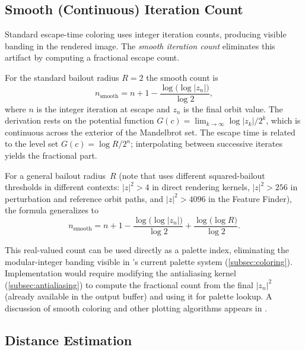 \subsection{Smooth (Continuous) Iteration Count}
\label{subsec:smooth-coloring}

Standard escape-time coloring uses integer iteration counts, producing
visible banding in the rendered image.  The \emph{smooth iteration
count} eliminates this artifact by computing a fractional escape count.

For the standard bailout radius $R = 2$ the smooth count is
\begin{equation}
  n_{\text{smooth}} = n + 1
    - \frac{\log\!\bigl(\log|z_n|\bigr)}{\log 2},
  \label{eq:smooth-iter}
\end{equation}
where $n$ is the integer iteration at escape and $z_n$ is the final
orbit value.  The derivation rests on the potential function
$G(c) = \lim_{k\to\infty} \log|z_k| / 2^k$, which is continuous across
the exterior of the Mandelbrot set.  The escape time is related to the
level set $G(c) = \log R / 2^n$; interpolating between successive
iterates yields the fractional part.

For a general bailout radius~$R$ (note that \FractalShark{} uses
different squared-bailout thresholds in different contexts: $|z|^2 > 4$
in direct rendering kernels, $|z|^2 > 256$ in perturbation and
reference orbit paths, and $|z|^2 > 4096$ in the Feature Finder),
the formula generalizes to
\begin{equation}
  n_{\text{smooth}} = n + 1
    - \frac{\log\!\bigl(\log|z_n|\bigr)}{\log 2}
    + \frac{\log\!\bigl(\log R\bigr)}{\log 2}.
  \label{eq:smooth-iter-general}
\end{equation}

This real-valued count can be used directly as a palette index,
eliminating the modular-integer banding visible in \FractalShark{}'s
current palette system (\cref{subsec:coloring}).  Implementation would
require modifying the antialiasing kernel (\cref{subsec:antialiasing})
to compute the fractional count from the final $|z_n|^2$ (already
available in the output buffer) and using it for palette lookup.  A
discussion of smooth coloring and other plotting algorithms appears in
\cite{WikipediaPlottingAlgorithms}.

\subsection{Distance Estimation}
\label{subsec:distance-estimation}

